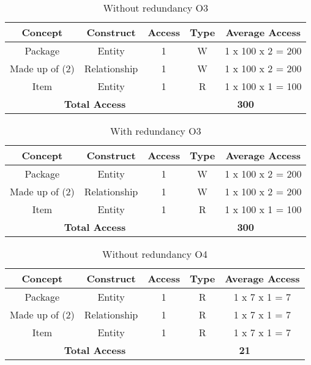\begin{table}[!h]\caption{Without redundancy O3}
	\begin{center}
		\begin{tabular}{| c | c | c | c | c |}
			\hline
			\textbf{Concept} & \textbf{Construct} & \textbf{Access} & \textbf{Type} & \textbf{Average Access} \\ \hline
			Package & Entity & 1 & W & 1 x 100 x 2 = 200 \\ \hline
			Made up of (2) & Relationship & 1 & W & 1 x 100 x 2 = 200 \\ \hline		Item & Entity & 1 & R & 1 x 100 x 1 = 100 \\ \hline		
			\multicolumn{3}{|c|}{\textbf{Total Access}} & \multicolumn{2}{|c|}{\textbf{300}} \\ \hline
		\end{tabular}
	\end{center}
\end{table}
\newpage
\begin{table}[!h]\caption{With redundancy O3}
	\begin{center}
		\begin{tabular}{| c | c | c | c | c |}
			\hline
			\textbf{Concept} & \textbf{Construct} & \textbf{Access} & \textbf{Type} & \textbf{Average Access} \\ \hline
			Package & Entity & 1 & W & 1 x 100 x 2 = 200 \\ \hline
			Made up of (2) & Relationship & 1 & W & 1 x 100 x 2 = 200 \\ \hline		Item & Entity & 1 & R & 1 x 100 x 1 = 100 \\ \hline		
			\multicolumn{3}{|c|}{\textbf{Total Access}} & \multicolumn{2}{|c|}{\textbf{300}} \\ \hline
		\end{tabular}
	\end{center}
\end{table}
\begin{table}[!h]\caption{Without redundancy O4}
	\begin{center}
		\begin{tabular}{| c | c | c | c | c |}
			\hline
			\textbf{Concept} & \textbf{Construct} & \textbf{Access} & \textbf{Type} & \textbf{Average Access} \\ \hline
			Package & Entity & 1 & R & 1 x 7 x 1 = 7 \\ \hline
			Made up of (2) & Relationship & 1 & R & 1 x 7 x 1 = 7 \\ \hline		Item & Entity & 1 & R & 1 x 7 x 1 = 7 \\ \hline		
			\multicolumn{3}{|c|}{\textbf{Total Access}} & \multicolumn{2}{|c|}{\textbf{21}} \\ \hline
		\end{tabular}
	\end{center}
\end{table}
